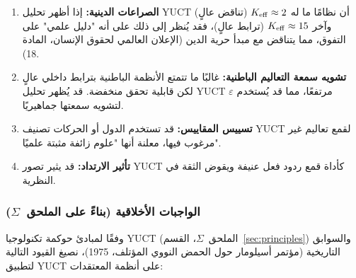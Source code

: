 \documentclass[11pt,a4paper]{article}
\newcommand{\eps}{\varepsilon}
\begin{document}
	\begin{enumerate}
		\item \textbf{الصراعات الدينية:} إذا أظهر تحليل YUCT أن نظامًا ما له $\Keff \approx 2$ (تناقض عالٍ) وآخر $\Keff \approx 15$ (ترابط عالٍ)، فقد يُنظر إلى ذلك على أنه "دليل علمي" على التفوق، مما يتناقض مع مبدأ حرية الدين (الإعلان العالمي لحقوق الإنسان، المادة 18).
		
		\item \textbf{تشويه سمعة التعاليم الباطنية:} غالبًا ما تتمتع الأنظمة الباطنية بترابط داخلي عالٍ لكن قابلية تحقق منخفضة. قد يُظهر تحليل YUCT $\eps$ مرتفعًا، مما قد يُستخدم لتشويه سمعتها جماهيريًا.
		
		\item \textbf{تسييس المقاييس:} قد تستخدم الدول أو الحركات تصنيف YUCT لقمع تعاليم غير مرغوب فيها، معلنة أنها "علوم زائفة مثبتة علميًا".
		
		\item \textbf{تأثير الارتداد:} قد يثير تصور YUCT كأداة قمع ردود فعل عنيفة ويقوض الثقة في النظرية.
	\end{enumerate}
	
	\subsubsection{الواجبات الأخلاقية (بناءً على الملحق~$\Sigma$)}
	
	وفقًا لمبادئ حوكمة تكنولوجيا YUCT (الملحق~$\Sigma$، القسم~\ref{sec:principles}) والسوابق التاريخية (مؤتمر أسيلومار حول الحمض النووي المؤتلف، 1975)، نصيغ القيود التالية لتطبيق YUCT على أنظمة المعتقدات:
	
\end{document}
